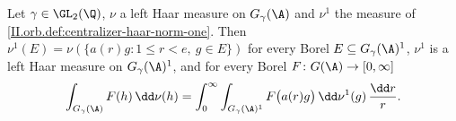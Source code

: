 Let $\gamma\in\GL_2(\Q)$, $\nu$ a left Haar measure on $G_\gamma(\A)$ and $\nu^1$ the measure of \cref{II.orb.def:centralizer-haar-norm-one}.
Then $\nu^1(E)=\nu(\{a(r)g:1\le r<e,\ g\in E\})$ for every Borel $E\subseteq G_\gamma(\A)^1$, $\nu^1$ is a left Haar measure on $G_\gamma(\A)^1$, and for every
Borel $F\colon G(\A)\to[0,\infty]$
\[
  \int_{G_\gamma(\A)}F(h)\,\dd\nu(h)=\int_0^\infty\int_{G_\gamma(\A)^1}F\bigl(a(r)g\bigr)\,\dd\nu^1(g)\,\frac{\dd r}{r}.
\]
